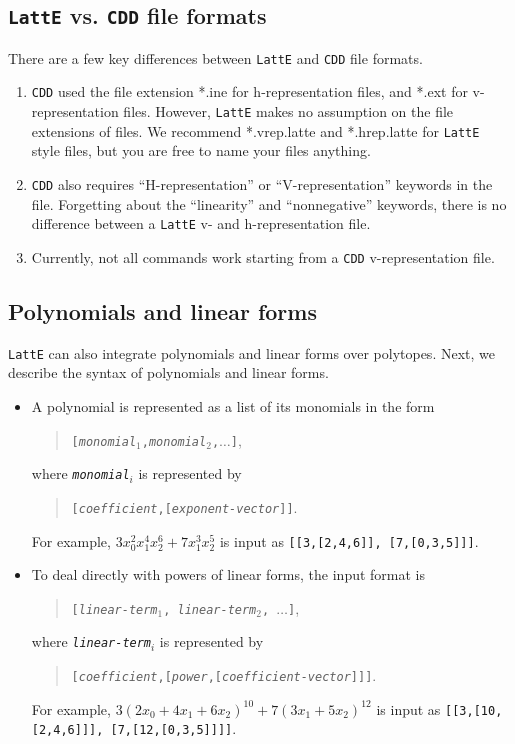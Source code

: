 \documentclass{article}
\newcommand{\latte}{{\tt LattE}\xspace}
\newcommand{\cdd}{{\tt CDD}\xspace}
\begin{document}
\subsection{\latte vs. \cdd file formats}
There are a few key differences between \latte and \cdd file formats.

\begin{enumerate}
	\item \cdd used the file extension *.ine for h-representation files, and *.ext for v-representation files. However, \latte makes no assumption on the file extensions of files. We recommend *.vrep.latte and *.hrep.latte for \latte style files, but you are free to name your files anything.
	\item \cdd also requires ``H-representation'' or ``V-representation'' keywords in the file. Forgetting about the ``linearity'' and ``nonnegative'' keywords, there is no difference between a \latte v- and h-representation file.
	\item Currently, not all commands work starting from a \cdd v-representation file.
\end{enumerate}


\subsection{Polynomials and linear forms}
\label{input-file:polynomial-and-linear-form}

\latte can also integrate polynomials and linear forms over polytopes. Next, we describe the syntax of polynomials and linear forms.

\begin{itemize}
\item A polynomial is represented as a list of its monomials in the form
  \begin{quote}
    \texttt{[{\itshape monomial}$_1$,{\itshape monomial}$_2$,$\dots$]},
  \end{quote}
  where \texttt{{\itshape monomial}$_i$} is represented by
  \begin{quote}
    \texttt{[{\itshape coefficient},[{\itshape exponent-vector}]]}.
  \end{quote}
  For example, $3x_0^2x_1^4x_2^6 + 7x_1^3x_2^5$ is input as \texttt{[[3,[2,4,6]], [7,[0,3,5]]]}. 

\item To deal directly with powers of linear forms, the input format is 
  \begin{quote}
    \texttt{[{\itshape linear-term$_1$}, {\itshape linear-term$_2$}, $\dots$]},
    \end{quote}
    where \texttt{{\itshape linear-term}$_i$} is represented by
    \begin{quote}
      \texttt{[{\itshape coefficient},[{\itshape power},[{\itshape coefficient-vector}]]]}.
    \end{quote}
    For example, $3(2x_0 + 4x_1 + 6x_2)^{10} + 7(3x_1 + 5x_2)^{12}$ is input
    as \texttt{[[3,[10,[2,4,6]]], [7,[12,[0,3,5]]]]}. 

\end{itemize}
\end{document}
